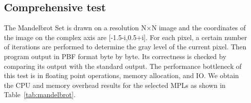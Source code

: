 \subsection{Comprehensive test}

The Mandelbrot Set is drawn on a resolution N×N image and the coordinates of the image on the complex axis are [-1.5-i,0.5+i].
For each pixel, a certain number of iterations are performed to determine the gray level of the current pixel.
Then program output in PBF format byte by byte.
Its correctness is checked by comparing its output with the standard output.
The performance bottleneck of this test is in floating point operations, memory allocation, and IO\@.
We obtain the CPU and memory overhead results for the selected MPLs as shown in Table~\ref{tab:mandelbrot}.



